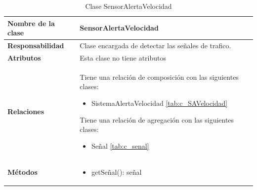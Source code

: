 \begin{table}[h]
\begin{center}
\begin{tabular}{p{} p{11cm}}
\textbf{Nombre de la clase} &  SensorAlertaVelocidad\\ \hline \hline
\textbf{Responsabilidad} &  Clase encargada de detectar las señales de trafico.   \\ \hline
\textbf{Atributos} & Esta clase no tiene atributos\\ \hline
\textbf{Relaciones} & \par Tiene una relación de composición con las siguientes clases:
                      \begin{itemize}
                        \item SistemaAlertaVelocidad \ref{tab:c_SAVelocidad}
                      \end{itemize}

                      \par Tiene una relación de agregación con las siguientes clases:
                      \begin{itemize}
                        \item Señal \ref{tab:c_senal}
                      \end{itemize}

                      \\ \hline

\textbf{Métodos} &  \begin{itemize}
                      \item getSeñal(): señal
                      \end{itemize}\\ \hline
\end{tabular}
\caption{Clase SensorAlertaVelocidad}
\label{tab:c_SensorAV}
\end{center}
\end{table}









